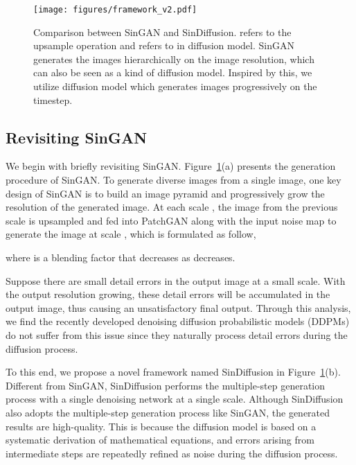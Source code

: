 \documentclass[10pt,twocolumn,letterpaper]{article}
\begin{document}
\begin{figure}[t]
  \centering
   \texttt{[image: figures/framework\_v2.pdf]}
   \vspace{-6mm}
   \caption{
   Comparison between SinGAN and SinDiffusion.
    refers to the upsample operation and  refers to  in diffusion model.
   SinGAN generates the images hierarchically on the image resolution, which can also be seen as a kind of diffusion model.
   Inspired by this, we utilize diffusion model which generates images progressively on the timestep.
   }
   \vspace{-5mm}
   \label{fig:framework}
\end{figure}

\subsection{Revisiting SinGAN}
We begin with briefly revisiting SinGAN.
Figure~\ref{fig:framework}(a) presents the generation procedure of SinGAN.
To generate diverse images from a single image, one key design of SinGAN is to build an image pyramid and progressively grow the resolution of the generated image.
At each scale , the image from the previous scale  is upsampled and fed into PatchGAN along with the input noise map  to generate the image at scale , which is formulated as follow,

where  is a blending factor that decreases as  decreases.

Suppose there are small detail errors in the output image at a small scale. With the output resolution growing, these detail errors will be accumulated in the output image, thus causing an unsatisfactory final output. Through this analysis, we find the recently developed denoising diffusion probabilistic models (DDPMs)~\cite{ho2020denoising} do not suffer from this issue since they naturally process detail errors during the diffusion process.



To this end, we propose a novel framework named SinDiffusion in Figure~\ref{fig:framework}(b).
Different from SinGAN, SinDiffusion performs the multiple-step generation process with a single denoising network at a single scale.
Although SinDiffusion also adopts the multiple-step generation process like SinGAN, the generated results are high-quality. This is because the diffusion model is based on a systematic derivation of mathematical equations, and errors arising from intermediate steps are repeatedly refined as noise during the diffusion process.
\end{document}
